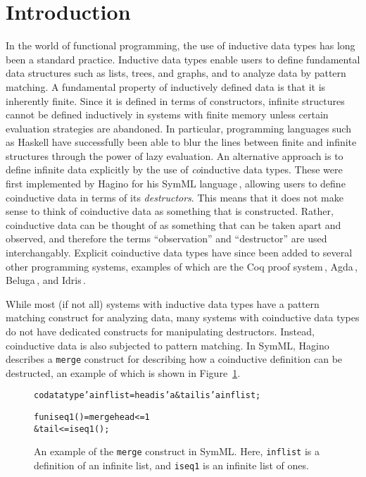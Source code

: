 \section{Introduction}
\label{sec:introduction}
In the world of functional programming, the use of inductive data types has long been a standard practice. Inductive data types enable users to define fundamental data structures such as lists, trees, and graphs, and to analyze data by pattern matching. A fundamental property of inductively defined data is that it is inherently finite. Since it is defined in terms of constructors, infinite structures cannot be defined inductively in systems with finite memory unless certain evaluation strategies are abandoned. In particular, programming languages such as Haskell have successfully been able to blur the lines between finite and infinite structures through the power of lazy evaluation. An alternative approach is to define infinite data explicitly by the use of \emph{co}inductive data types. These were first implemented by Hagino for his SymML language\,\citep{Hagino89}, allowing users to define coinductive data in terms of its \emph{destructors}. This means that it does not make sense to think of coinductive data as something that is constructed. Rather, coinductive data can be thought of as something that can be taken apart and observed, and therefore the terms ``observation'' and ``destructor'' are used interchangably. Explicit coinductive data types have since been added to several other programming systems, examples of which are the Coq proof system\,\citep{Coq:manual}, Agda\,\citep{Norell:thesis}, Beluga\,\citep{Pientka10}, and Idris\,\citep{BradyIdrisImpl13}.

While most (if not all) systems with inductive data types have a pattern matching construct for analyzing data, many systems with coinductive data types do not have dedicated constructs for manipulating destructors. Instead, coinductive data is also subjected to pattern matching. In SymML, Hagino describes a \texttt{merge} construct for describing how a coinductive definition can be destructed, an example of which is shown in Figure~\ref{fig:merge_SymML}.

\begin{figure}
\begin{alltt}
codatatype 'a inflist = head is 'a & tail is 'a inflist;

fun iseq1() = merge head <= 1
              & tail <= iseq1();
\end{alltt}
\caption{An example of the \texttt{merge} construct in SymML. Here, \texttt{inflist} is a definition of an infinite list, and \texttt{iseq1} is an infinite list of ones.}
\label{fig:merge_SymML}
\end{figure}

